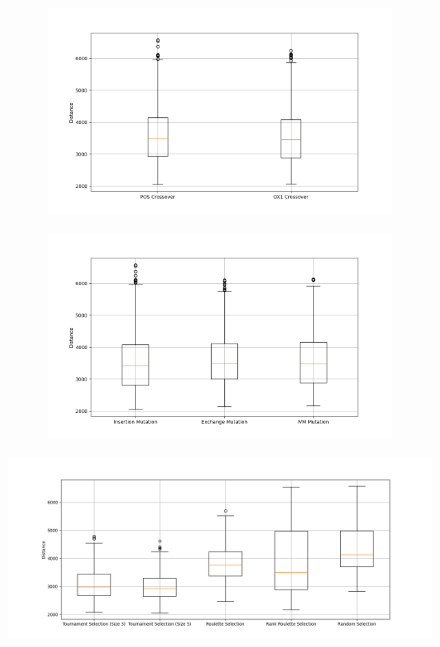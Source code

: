 \documentclass[11pt]{article}
\begin{document}
\begin{figure}[H]
    \centering
    \begin{subfigure}{0.48\textwidth}
        \includegraphics[width=\textwidth]{../results/crossover_method_boxplot.png}
        \label{fig:crossover}
    \end{subfigure}
    \begin{subfigure}{0.48\textwidth}
        \includegraphics[width=\textwidth]{../results/mutation_method_boxplot.png}
        \label{fig:mutation}
    \end{subfigure}
\end{figure}

\begin{figure}
    \includegraphics[width=\textwidth]{../results/parent_selection_method_boxplot.png}
    \label{fig:parent_selection}
\end{figure}
\end{document}
